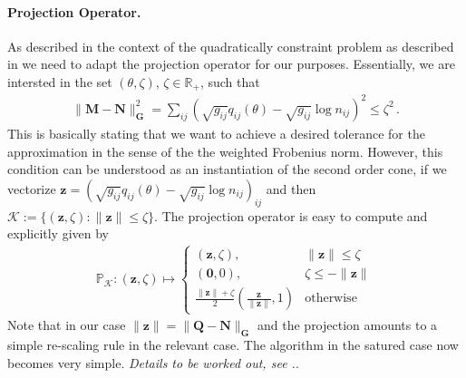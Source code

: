\documentclass{article}
\renewcommand{\Re}{{\mathbb R}}
\newcommand{\z}{{\mathbf z}}
\newcommand{\mN}{{\mathbf N}}
\newcommand{\mM}{{\mathbf M}}
\newcommand{\mQ}{{\mathbf Q}}
\newcommand{\mG}{{\mathbf G}}
\begin{document}
\paragraph{Projection Operator.}

As described in the context of the quadratically constraint problem as described in \cite[Section 3.3.2]{cai2010singular} we need to adapt the projection operator for our purposes. Essentially, we are intersted in the set $(\theta,\zeta)$, $\zeta \in \Re_+$, such that
\begin{align}
\| \mM - \mN \|^2_{\mG} = \sum_{ij} \left( \sqrt{g_{ij}} q_{ij}(\theta) - \sqrt{g_{ij}} \log n_{ij} \right)^2 \le \zeta^2 \,.
\end{align}
This is basically stating that we want to achieve a desired tolerance for the approximation in the sense of the the weighted Frobenius norm. However, this condition can be understood as an instantiation of the second order cone, if we vectorize $\z = (\sqrt{g_{ij}} q_{ij}(\theta) - \sqrt{g_{ij}} \log n_{ij})_{ij}$ and then $\mathcal K := \{ (\z,\zeta): \| \z\| \le \zeta \}$. The projection operator is easy to compute and explicitly given by
\begin{align}
\mathbb P_{\mathcal K}:  (\z,\zeta) \mapsto
\begin{cases}
(\z,\zeta), & \| \z\| \le \zeta \\
(\mathbf 0,0), & \zeta \le -\| \z\| \\
\frac{\|\z\| + \zeta}{ 2} \left(\frac{\z}{\|\z\|}, 1\right) & \text{otherwise}
\end{cases}
\end{align}
Note that in our case $\| \z\| = \| \mQ - \mN \|_\mG$ and the projection amounts to a simple re-scaling rule in the relevant case. The algorithm in the satured case now becomes very simple. \textit{Details to be worked out, see \cite[Eq.~(3.12)]{cai2010singular}.}.\\
\end{document}
